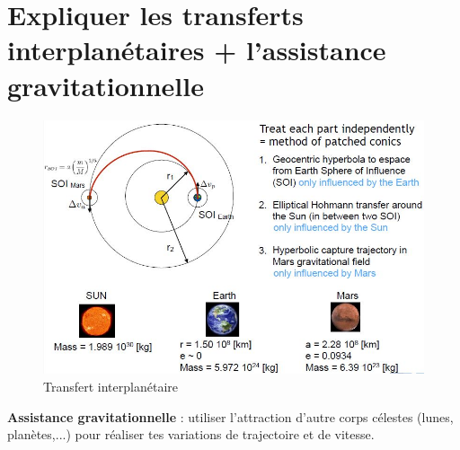 \documentclass{report}
\begin{document}
\section{Expliquer les transferts interplanétaires + l'assistance gravitationnelle}

\begin{figure}[h!]
    \centering
    \includegraphics[scale=0.6]{60.JPG}
    \caption{Transfert interplanétaire}
    \label{60}
\end{figure}

\textbf{Assistance gravitationnelle} : utiliser l'attraction d'autre corps célestes (lunes, planètes,...) pour réaliser tes variations de trajectoire et de vitesse.
\end{document}
